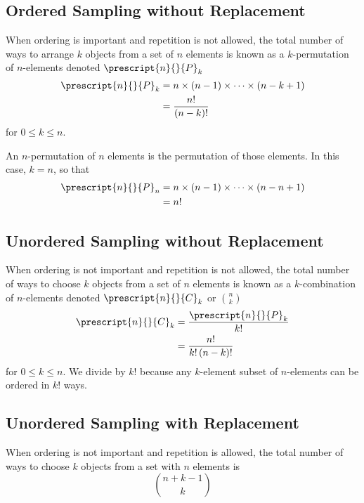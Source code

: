 \documentclass{article}
\begin{document}
\subsection{Ordered Sampling without Replacement}
When ordering is important and repetition is not allowed,
the total number of ways to arrange \(k\) objects from a set of \(n\) elements is
known as a \(k\)-permutation of \(n\)-elements denoted \(\prescript{n}{}{P}_k\)
\begin{align*}
    \prescript{n}{}{P}_k & = n \times \left( n - 1 \right) \times \cdots \times \left( n - k + 1 \right) \\
                         & = \frac{n!}{\left( n - k \right)!}
\end{align*}
for \(0 \leq k \leq n\).
\begin{definition}
    An \(n\)-permutation of \(n\) elements is the permutation of those elements.
    In this case, \(k = n\), so that
    \begin{align*}
        \prescript{n}{}{P}_n & = n \times \left( n - 1 \right) \times \cdots \times \left( n - n + 1 \right) \\
                             & = n!
    \end{align*}
\end{definition}
\subsection{Unordered Sampling without Replacement}
When ordering is not important and repetition is not allowed,
the total number of ways to choose \(k\) objects from a set of \(n\) elements is
known as a \(k\)-combination of \(n\)-elements denoted \(\prescript{n}{}{C}_k\) or \(\binom{n}{k}\)
\begin{align*}
    \prescript{n}{}{C}_k & = \frac{\prescript{n}{}{P}_k}{k!}     \\
                         & = \frac{n!}{k! \left( n - k \right)!}
\end{align*}
for \(0 \leq k \leq n\). We divide by \(k!\) because any \(k\)-element subset of \(n\)-elements %
can be ordered in \(k!\) ways. %
\subsection{Unordered Sampling with Replacement}
When ordering is not important and repetition is allowed,
the total number of ways to choose \(k\) objects from a set with \(n\) elements is
\begin{equation*}
    \binom{n + k - 1}{k}
\end{equation*}
\end{document}
